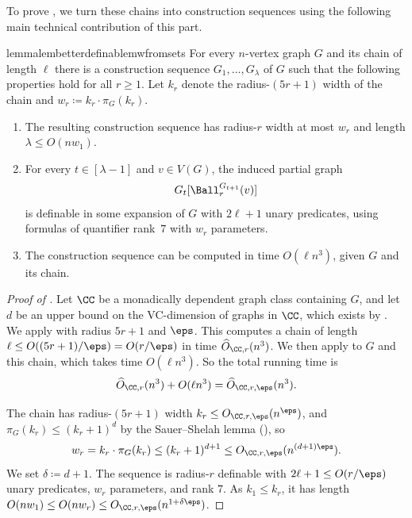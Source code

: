 To prove , we turn these chains into construction sequences using the following main technical contribution of this part.

\begin{restatable}{lemma}{lembetterdefinablemwfromsets}\label{lem:better-definable-mw-from-sets}
  For every $n$-vertex graph $G$ and its chain of length $\ell$ there is
  a construction sequence $G_1,\ldots,G_\lambda$ of $G$ such that the following properties hold for all $r\ge 1$.
  Let $k_r$ denote the radius-$(5r+1)$ width of the chain and $w_r \coloneqq k_r\cdot \pi_G(k_r)$.
  \begin{enumerate}
    \item The resulting construction sequence has radius-$r$ width at most $w_r$ and length $\lambda\le O(nw_1)$.
    \item For every $t\in[\lambda-1]$ and $v\in V(G)$, the induced partial graph
    \[
        G_t[\Ball^{G_{t+1}}_r(v)]
    \]
    is definable in some expansion of $G$
    with $2\ell+1$ unary predicates, using formulas of quantifier rank~$7$ with $w_r$ parameters.
    \item The construction sequence can be computed in time $O(\ell n^3)$, given $G$ and its chain.
  \end{enumerate}
\end{restatable}

\begin{proof}[Proof of ]
  Let $\CC$ be a monadically dependent graph class containing $G$, and let $d$ be an upper bound on the VC-dimension of graphs in $\CC$, which exists by .
  We apply  with radius $5r+1$ and $\eps$.
  This computes a chain of length $\ell\le O((5r+1)/\eps)=O(r/\eps)$ in time $\widehat O_{\CC,r}(n^3)$.
  We then apply  to $G$ and this chain, which takes time $O(\ell n^3)$.
  So the total running time is
  \[
    \widehat O_{\CC,r}(n^3)+O(\ell n^3)
    =\widehat O_{\CC,r,\eps}(n^3).
  \]

  The chain has radius-$(5r+1)$ width $k_r\le O_{\CC,r,\eps}(n^\eps)$, and $\pi_G(k_r)\le(k_r+1)^d$
  by the Sauer--Shelah lemma (), so
  \[
    w_r=k_r\cdot\pi_G(k_r)\le(k_r+1)^{d+1}\le O_{\CC,r,\eps}(n^{(d+1)\eps}).
  \]
  We set $\delta\coloneqq d+1$.
  The sequence is radius-$r$ definable with $2\ell+1\le O(r/\eps)$ unary predicates, $w_r$ parameters, and rank $7$.
  As $k_1\le k_r$, it has length $O(nw_1)\le O(nw_r)\le O_{\CC,r,\eps}(n^{1+\delta\eps})$.
\end{proof}

